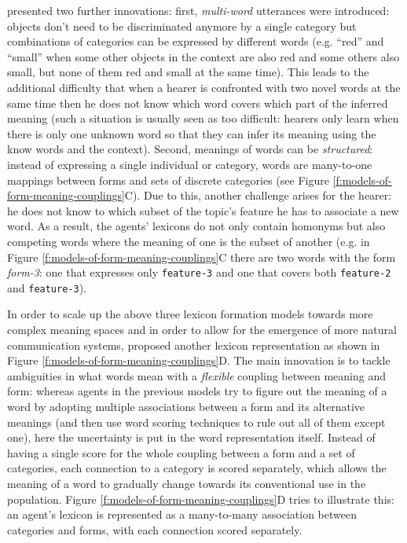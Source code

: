 \cite{looveren99multiple,looveren00analysis} presented two further
innovations: first, \emph{multi-word} utterances were introduced:
objects don't need to be discriminated anymore by a single category
but combinations of categories can be expressed by different words
(e.g. ``red'' and ``small'' when some other objects in the context are
also red and some others also small, but none of them red and small at
the same time). This leads to the additional difficulty that when a
hearer is confronted with two novel words at the same time then he
does not know which word covers which part of the inferred meaning
(such a situation is usually seen as too difficult: hearers only learn
when there is only one unknown word so that they can infer its meaning
using the know words and the context). Second, meanings of words can
be \emph{structured}: instead of expressing a single individual or
category, words are many-to-one mappings between forms and sets of
discrete categories (see Figure
\ref{f:models-of-form-meaning-couplings}C). Due to this, another
challenge arises for the hearer: he does not know to which subset of
the topic's feature he has to associate a new word. As a result, the
agents' lexicons do not only contain homonyms but also competing words
where the meaning of one is the subset of another (e.g. in Figure
\ref{f:models-of-form-meaning-couplings}C there are two words with the
form \emph{form-3}: one that expresses only {\tt feature-3} and one
that covers both {\tt feature-2} and {\tt feature-3}).


In order to scale up the above three lexicon formation models towards
more complex meaning spaces and in order to allow for the emergence of
more natural communication systems,
\cite*{wellens08flexible,wellens12multi-dimensional} proposed another
lexicon representation as shown in Figure
\ref{f:models-of-form-meaning-couplings}D. The main innovation is to
tackle ambiguities in what words mean with a \emph{flexible} coupling
between meaning and form: whereas agents in the previous models try to
figure out the meaning of a word by adopting multiple associations
between a form and its alternative meanings (and then use word scoring
techniques to rule out all of them except one), here the uncertainty
is put in the word representation itself. Instead of having a single
score for the whole coupling between a form and a set of categories,
each connection to a category is scored separately, which allows the
meaning of a word to gradually change towards its conventional use in
the population. Figure \ref{f:models-of-form-meaning-couplings}D tries
to illustrate this: an agent's lexicon is represented as a
many-to-many association between categories and forms, with each
connection scored separately.




